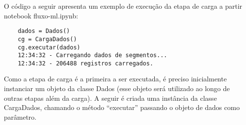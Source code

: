 O código a seguir apresenta um exemplo de execução da etapa de carga a partir notebook fluxo-ml.ipynb: 

\begin{lstlisting}
	dados = Dados()
	cg = CargaDados()
	cg.executar(dados)
	12:34:32 - Carregando dados de segmentos...
	12:34:32 - 206488 registros carregados.
\end{lstlisting}

Como a etapa de carga é a primeira a ser executada, é preciso inicialmente instanciar um objeto da classe Dados (esse objeto será utilizado ao longo de outras etapas além da carga). A seguir é criada uma instância da classe CargaDados, chamando o método ``executar'' passando o objeto de dados como parâmetro.


